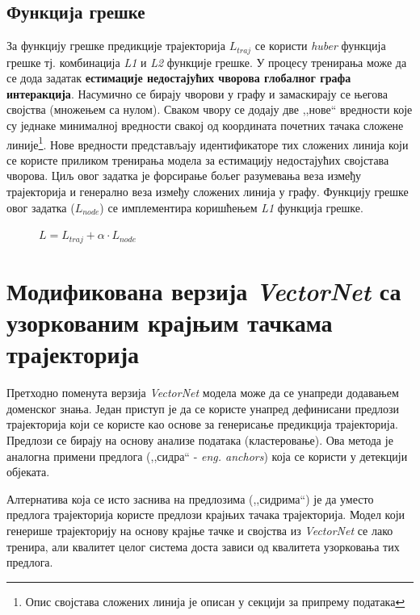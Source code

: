 \documentclass[11pt,oneside]{memoir}
\begin{document}
\subsection{Функција грешке}

За функцију грешке предикције трајекторија $L_{traj}$ се користи \textit{huber} функција грешке тј. комбинација \textit{L1} и \textit{L2} функције грешке. У процесу
тренирања може да се дода задатак \textbf{естимације недостајућих чворова глобалног графа интеракција}. Насумично се бирају чворови у графу и замаскирају
се његова својства (множењем са нулом). Сваком чвору се додају две ,,нове`` вредности које су једнаке минималној вредности свакој од координата почетних 
тачака сложене линије\footnote{Опис својстава сложених линија је описан у секцији за припрему података}. Нове вредности представљају идентификаторе
тих сложених линија који се користе приликом тренирања модела за естимацију недостајућих својстава чворова. Циљ овог задатка је форсирање бољег разумевања
веза између трајекторија и генерално веза између сложених линија у графу. Функцију грешке овог задатка ($L_{node}$) се имплементира коришћењем \textit{L1}
функција грешке. \cite{vectornet} 

\begin{figure}[H]
  \centering
  $L = L_{traj} + \alpha \cdot L_{node}$
\end{figure}

\section{Модификована верзија \textit{VectorNet} са узоркованим крајњим тачкама трајекторија}

Претходно поменута верзија \textit{VectorNet} модела може да се унапреди додавањем доменског знања. Један приступ је да се користе унапред
дефинисани предлози трајекторија који се користе као основе за генерисање предикција трајекторија. Предлози се бирају на основу 
анализе података (кластеровање). \cite{multipath}
Ова метода је аналогна примени предлога (,,сидра`` - \textit{eng. anchors}) која се користи у детекцији објеката.

Алтернатива која се исто заснива на предлозима (,,сидрима``) је да уместо предлога трајекторија користе предлози крајњих тачака трајекторија. Модел
који генерише трајекторију на основу крајње тачке и својства из \textit{VectorNet} се лако тренира, али квалитет целог система доста зависи
од квалитета узорковања тих предлога. 
\end{document}
